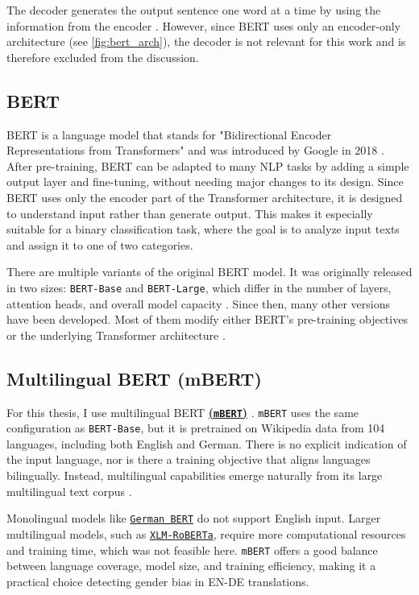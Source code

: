 The decoder generates the output sentence one word at a time by using the information from the encoder \parencite{xiaoIntroductionTransformersNLP2023}. However, since BERT uses only an encoder-only architecture (see \autoref{fig:bert_arch}), the decoder is not relevant for this work and is therefore excluded from the discussion.

\subsection{BERT}
    BERT is a language model that stands for "Bidirectional Encoder Representations from Transformers" and was introduced by Google in 2018 \parencite{devlinBERTPretrainingDeep2019}. After pre-training, BERT can be adapted to many NLP tasks by adding a simple output layer and fine-tuning, without needing major changes to its design. Since BERT uses only the encoder part of the Transformer architecture, it is designed to understand input rather than generate output. This makes it especially suitable for a binary classification task, where the goal is to analyze input texts and assign it to one of two categories.

    There are multiple variants of the original BERT model. It was originally released in two sizes: \texttt{BERT-Base} and \texttt{BERT-Large}, which differ in the number of layers, attention heads, and overall model capacity \parencite{devlinBERTPretrainingDeep2019}. Since then, many other versions have been developed. Most of them modify either BERT’s pre-training objectives or the underlying Transformer architecture \parencite{libovickyHowLanguageNeutralMultilingual2019}.

\subsection{Multilingual BERT (mBERT)}
    For this thesis, I use multilingual BERT \textbf{\href{https://huggingface.co/google-bert/bert-base-multilingual-cased}{(\texttt{mBERT})}} \parencite{devlinBERTPretrainingDeep2019}. \texttt{mBERT} uses the same configuration as \texttt{BERT-Base}, but it is pretrained on Wikipedia data from 104 languages, including both English and German. There is no explicit indication of the input language, nor is there a training objective that aligns languages bilingually. Instead, multilingual capabilities emerge naturally from its large multilingual text corpus \parencite{piresHowMultilingualMultilingual2019}. 

    Monolingual models like \href{https://huggingface.co/google-bert/bert-base-german-cased}{\texttt{German BERT}} do not support English input. Larger multilingual models, such as \href{https://huggingface.co/docs/transformers/en/model_doc/xlm-roberta}{\texttt{XLM-RoBERTa}}, require more computational resources and training time, which was not feasible here. \texttt{mBERT} offers a good balance between language coverage, model size, and training efficiency, making it a practical choice detecting gender bias in EN-DE translations.

